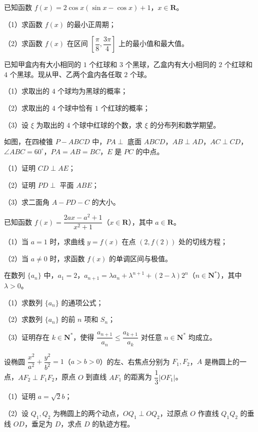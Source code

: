 \begin{question}
已知函数 $f(x)=2\cos x(\sin x-\cos x)+1$，$x\in\mathbf{R}$。

（1）求函数 $f(x)$ 的最小正周期；

（2）求函数 $f(x)$ 在区间 $\left[\dfrac{\pi}{8},\dfrac{3\pi}{4}\right]$ 上的最小值和最大值。

\end{question}
\begin{question}
已知甲盒内有大小相同的 $1$ 个红球和 $3$ 个黑球，乙盒内有大小相同的 $2$ 个红球和 $4$ 个黑球。现从甲、乙两个盒内各任取 $2$ 个球。

（1）求取出的 $4$ 个球均为黑球的概率；

（2）求取出的 $4$ 个球中恰有 $1$ 个红球的概率；

（3）设 $\xi$ 为取出的 $4$ 个球中红球的个数，求 $\xi$ 的分布列和数学期望。

\Needspace{0.4\textheight}
\end{question}
\begin{question}
如图，在四棱锥 $P-ABCD$ 中，$PA\perp$ 底面 $ABCD$，$AB\perp AD$，$AC\perp CD$，$\angle ABC=60^\circ$，$PA=AB=BC$，$E$ 是 $PC$ 的中点。

（1）证明 $CD\perp AE$；

（2）证明 $PD\perp$ 平面 $ABE$；

（3）求二面角 $A-PD-C$ 的大小。
\nopagebreak[4]
\begin{center}\end{center}
\nopagebreak[4]
\end{question}
\begin{question}
已知函数 $f(x)=\dfrac{2ax-a^2+1}{x^2+1}$（$x\in\mathbf{R}$），其中 $a\in\mathbf{R}$。

（1）当 $a=1$ 时，求曲线 $y=f(x)$ 在点 $(2,f(2))$ 处的切线方程；

（2）当 $a\neq 0$ 时，求函数 $f(x)$ 的单调区间与极值。

\end{question}
\begin{question}
在数列 $\{a_n\}$ 中，$a_1=2$，$a_{n+1}=\lambda a_n+\lambda^{n+1}+(2-\lambda)2^n$（$n\in\mathbf{N}^*$），其中 $\lambda>0$。

（1）求数列 $\{a_n\}$ 的通项公式；

（2）求数列 $\{a_n\}$ 的前 $n$ 项和 $S_n$；

（3）证明存在 $k\in\mathbf{N}^*$，使得 $\dfrac{a_{n+1}}{a_n}\leqslant\dfrac{a_{k+1}}{a_k}$ 对任意 $n\in\mathbf{N}^*$ 均成立。

\end{question}
\begin{question}
设椭圆 $\dfrac{x^2}{a^2}+\dfrac{y^2}{b^2}=1$（$a>b>0$）的左、右焦点分别为 $F_1,F_2$，$A$ 是椭圆上的一点，$AF_2\perp F_1F_2$，原点 $O$ 到直线 $AF_1$ 的距离为 $\dfrac{1}{3}|OF_1|$。

（1）证明 $a=\sqrt{2}b$；

（2）设 $Q_1,Q_2$ 为椭圆上的两个动点，$OQ_1\perp OQ_2$，过原点 $O$ 作直线 $Q_1Q_2$ 的垂线 $OD$，垂足为 $D$，求点 $D$ 的轨迹方程。

\end{question}